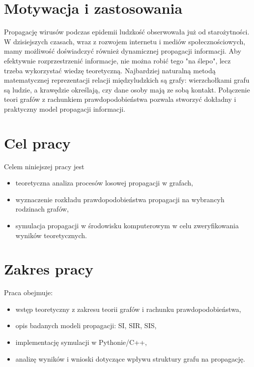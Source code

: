 \section{Motywacja i zastosowania}
Propagację wirusów podczas epidemii ludzkość obserwowała już od starożytności. W dzisiejszych czasach, wraz z rozwojem internetu i mediów społecznościowych, mamy możliwość doświadczyć również dynamicznej propagacji informacji. Aby efektywnie rozprzestrzenić informacje, nie można robić tego "na ślepo", lecz trzeba wykorzystać wiedzę teoretyczną. Najbardziej naturalną metodą matematycznej reprezentacji relacji międzyludzkich są grafy: wierzchołkami grafu są ludzie, a krawędzie określają, czy dane osoby mają ze sobą kontakt. Połączenie teori grafów z rachunkiem prawdopodobieństwa pozwala stworzyć dokładny i praktyczny model propagacji informacji.

\section{Cel pracy}
Celem niniejszej pracy jest 
\begin{itemize}
    \item teoretyczna analiza procesów losowej propagacji w grafach,
    \item wyznaczenie rozkładu prawdopodobieństwa propagacji na wybrancyh rodzinach grafów,
    \item symulacja propagacji w środowisku komputerowym w celu zweryfikowania wyników teoretycznych.
\end{itemize}


\section{Zakres pracy}
Praca obejmuje:
\begin{itemize}
    \item wstęp teoretyczny z zakresu teorii grafów i rachunku prawdopodobieństwa,
    \item opis badanych modeli propagacji: SI, SIR, SIS,
    \item implementację symulacji w Pythonie/C++,
    \item analizę wyników i wnioski dotyczące wpływu struktury grafu na propagację.
\end{itemize}
